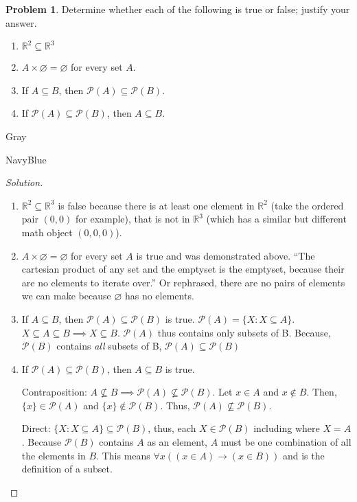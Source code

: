 \documentclass[12pt]{amsart}
\newcounter{problem_number}[section]
\theoremstyle{named}
\newenvironment{soln}
{\begin{color}{Gray}\begin{framed}\begin{color}{NavyBlue}\begin{proof}[Solution]
\doublespacing}
{\end{proof}\end{color}\end{framed}\end{color}}
\theoremstyle{definition}
\newtheorem{problem}{Problem}
\newcommand{\R}{\mathbb R}
\begin{document}
\begin{problem}
	Determine whether each of the following is true or false; justify your answer.
	\begin{enumerate}
		\item $\R^2\subseteq\R^3$
		\item $A\times\varnothing = \varnothing$ for every set $A$.
		\item If $A\subseteq B$, then $\mathscr P(A)\subseteq\mathscr P(B)$.	
		\item If $\mathscr P(A)\subseteq\mathscr P(B)$, then $A\subseteq B$. 
	\end{enumerate}
	
\end{problem}

\begin{soln}
    \phantom{ }
    \begin{enumerate}
        \item $\R^2\subseteq\R^3$ is false because there is at least one element
        in $\R^2$ (take the ordered pair $(0,0)$ for example), that is not in
        $\R^3$ (which has a similar but different math object $(0,0,0)$). 

        \item $A\times\varnothing = \varnothing$ for every set $A$ is true and
        was demonstrated above. ``The cartesian product of any set and the
        emptyset is the emptyset, because their are no elements to iterate
        over.'' Or rephrased, there are no pairs of elements we can make because
        $\varnothing$ has no elements.

        \item If $A\subseteq B$, then $\mathscr P(A)\subseteq\mathscr P(B)$ is
        true. $\mathscr P(A) = \{X : X \subseteq A\}$. $X \subseteq A \subseteq
        B \implies X \subseteq B$. $\mathscr P(A)$ thus contains only subsets of
        B. Because, $\mathscr P(B)$ contains \textit{all} subsets of B,
        $\mathscr P(A)\subseteq \mathscr P(B)$

        \item If $\mathscr P(A)\subseteq\mathscr P(B)$, then $A\subseteq B$ is true.
        
        \noindent Contraposition: $A \nsubseteq B \implies \mathscr P(A) \nsubseteq \mathscr P(B)$.
        Let $x \in A$ and $x \notin B$. Then, $\{x\} \in \mathscr P(A)$ and $\{x\} \notin
        \mathscr P(B)$. Thus, $\mathscr P(A) \nsubseteq \mathscr P(B)$. 

        \phantom{ }

        \noindent Direct: $\{X : X \subseteq A\} \subseteq \mathscr P(B)$, thus, each $X
        \in \mathscr P(B)$ including where $X = A$. Because $\mathscr P(B)$ contains
        $A$ as an element, $A$ must be one combination of all the elements in $B$. 
        This means $\forall x ((x \in A) \rightarrow (x \in B))$ and is the definition of
        a subset. 
	\end{enumerate}
\end{soln}
\end{document}
